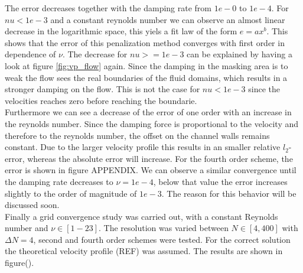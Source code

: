 The error decreases together with the damping rate from $1e-0$ to $1e-4$. For $nu<1e-3$ and a constant reynolds number we can observe an almost linear decrease in the logarithmic space,
this yiels a fit law of the form $ e = ax^b$. This shows that the error of this penalization method converges with first order in dependence of $\nu$.
The decrease for $nu>=1e-3$ can be explained by having a look at figure \ref{fig:vp_flow} again. Since the damping in the masking area is to
weak the flow sees the real boundaries of the fluid domains, which results in a stronger damping on the flow.
This is not the case for $nu<1e-3$ since the velocities reaches zero before reaching the boundarie.\\
Furthermore we can see a decrease of the error of one order with an increase in the reynolds number.
Since the damping force is proportional to the velocity and therefore to the reynolds number, the offset on the channel walls remains constant.
Due to the larger velocity profile this results in an smaller relative $l_2$-error, whereas the absolute error will increase.
For the fourth order scheme, the error is shown in figure APPENDIX.
We can observe a similar convergence  until the damping rate decreases to $\nu=1e-4$, below that value the error increases slightly to the order of magnitude of $1e-3$.
The reason for this behavior will be discussed soon.\\
Finally a grid convergence study was carried out, with a constant Reynolds number and $\nu \in [1-23]$.
The resolution was varied between $N\in [4, 400]$ with $\Delta N = 4$, second and fourth order schemes were tested.
For the correct solution the theoretical velocity profile (REF) was assumed.
The results are shown in figure().

